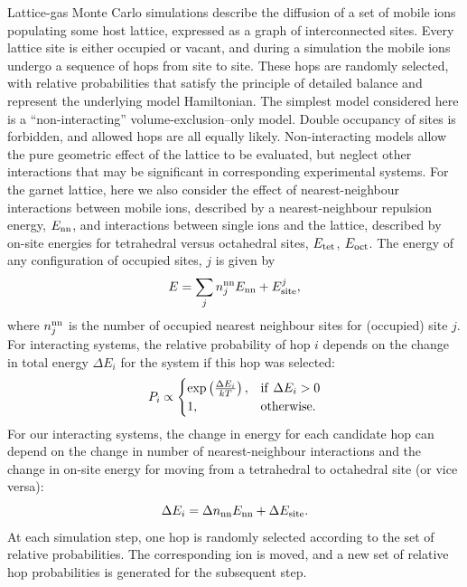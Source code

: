 \documentclass[aps,prb,twocolumn,superscriptaddress,reprint]{revtex4-1}
\begin{document}
Lattice-gas Monte Carlo simulations describe the diffusion of a set of mobile ions populating some host lattice, expressed as a graph of interconnected sites. 
Every lattice site is either occupied or vacant, and during a simulation the mobile ions undergo a sequence of hops from site to site. 
These hops are randomly selected, with relative probabilities that satisfy the principle of detailed balance and represent the underlying model Hamiltonian. 
The simplest model considered here is a ``non-interacting'' volume-exclusion--only model.\cite{Kutner_PhysLett1981} Double occupancy of sites is forbidden, and allowed hops are all equally likely. 
Non-interacting models allow the pure geometric effect of the lattice to be evaluated, but neglect other interactions that may be significant in corresponding experimental systems. 
For the garnet lattice, here we also consider the effect of nearest-neighbour interactions between mobile ions, described by a nearest-neighbour repulsion energy, $E_{\mathrm{nn}}$, and interactions between single ions and the lattice, described by on-site energies for tetrahedral versus octahedral sites, $E_{\mathrm{tet}}$, $E_{\mathrm{oct}}$. 
The energy of any configuration of occupied sites, $j$ is given by
\begin{equation}
  E = \sum_j n_j^{\mathrm{nn}}E_{\mathrm{nn}} + E_{\mathrm{site}}^j,
\end{equation}
where $n^{\mathrm{nn}}_j$ is the number of occupied nearest neighbour sites for (occupied) site $j$. 
For interacting systems, the relative probability of hop $i$ depends on the change in total energy $\Delta E_i$ for the system if this hop was selected:
\begin{equation}
  P_i \propto 
  \begin{cases}
    \mathrm{exp}\left(\frac{\Delta E_i}{kT}\right),& \mathrm{if}\,\,\Delta E_i > 0 \\
    1,                                        & \mathrm{otherwise.}
  \end{cases}
\end{equation}
For our interacting systems, the change in energy for each candidate hop can depend on the change in number of nearest-neighbour interactions and the change in on-site energy for moving from a tetrahedral to octahedral site (or vice versa):
\begin{equation}
  \Delta E_i = \Delta n_{\mathrm{nn}}E_{\mathrm{nn}} + \Delta E_{\mathrm{site}}.
\end{equation}
At each simulation step, one hop is randomly selected according to the set of relative probabilities. 
The corresponding ion is moved, and a new set of relative hop probabilities is generated for the subsequent step.
\end{document}
